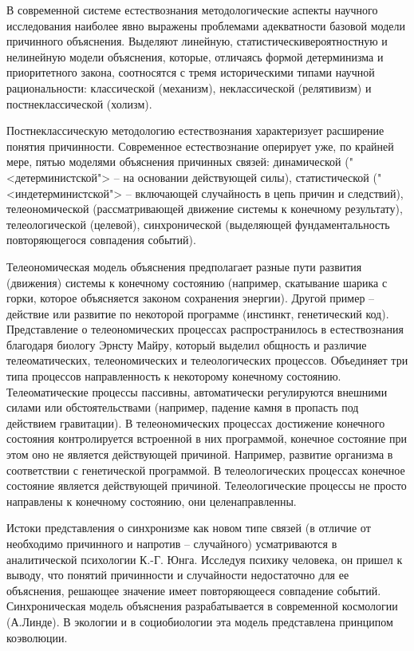 \documentclass[exam_answers.tex]{subfiles}
\begin{document}
В современной системе естествознания методологические аспекты
научного исследования наиболее явно выражены проблемами адекватности
базовой модели причинного объяснения. Выделяют линейную, статистическивероятностную и нелинейную модели объяснения, которые, отличаясь формой
детерминизма и приоритетного закона, соотносятся с тремя историческими
типами научной рациональности: классической (механизм), неклассической
(релятивизм) и постнеклассической (холизм).

Постнеклассическую методологию естествознания характеризует
расширение понятия причинности.
Современное естествознание оперирует уже,
по крайней мере, пятью моделями объяснения причинных связей:
динамической ("<детерминистской"> -- на основании действующей силы),
статистической ("<индетерминистской"> -- включающей случайность в цепь
причин и следствий), телеономической (рассматривающей движение системы
к конечному результату), телеологической (целевой), синхронической
(выделяющей фундаментальность повторяющегося совпадения событий).

Телеономическая модель объяснения предполагает разные пути развития
(движения) системы к конечному состоянию (например, скатывание шарика с
горки, которое объясняется законом сохранения энергии). Другой пример --
действие или развитие по некоторой программе (инстинкт, генетический код).
Представление о телеономических процессах распространилось в
естествознания благодаря биологу Эрнсту Майру, который выделил общность и
различие телеоматических, телеономических и телеологических процессов.
Объединяет три типа процессов направленность к некоторому конечному
состоянию.
Телеоматические процессы пассивны, автоматически регулируются
внешними силами или обстоятельствами (например, падение камня в пропасть
под действием гравитации).
В телеономических процессах достижение
конечного состояния контролируется встроенной в них программой, конечное
состояние при этом оно не является действующей причиной.
Например, развитие организма в соответствии с генетической программой.
В телеологических процессах конечное состояние является действующей
причиной. Телеологические процессы не просто направлены к конечному
состоянию, они целенаправленны.

Истоки представления о синхронизме как новом типе связей (в отличие от
необходимо причинного и напротив -- случайного) усматриваются в
аналитической психологии К.-Г. Юнга.
Исследуя психику человека, он пришел к выводу, что понятий причинности и случайности недостаточно для ее
объяснения, решающее значение имеет повторяющееся совпадение событий.
Синхроническая модель объяснения разрабатывается в современной космологии (А.Линде).
В экологии и в социобиологии эта модель представлена принципом коэволюции.
\end{document}

